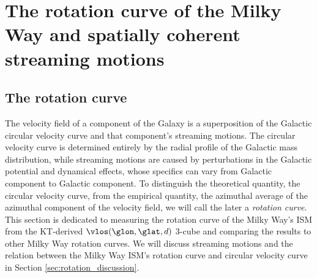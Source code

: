 \section{The rotation curve of the Milky Way and spatially coherent streaming motions}
\label{sec:rotation_curve}

\subsection{The rotation curve}
\label{sec:rotation_fit}

The velocity field of a component of the Galaxy is a superposition of the Galactic circular velocity curve and that component's streaming motions. 
The circular velocity curve is determined entirely by the radial profile of the Galactic mass distribution, while streaming motions are caused by perturbations in the Galactic potential and dynamical effects, whose specifics can vary from Galactic component to Galactic component. 
To distinguish the theoretical quantity, the circular velocity curve, from the empirical quantity, the azimuthal average of the azimuthal component of the velocity field, we will call the later a \emph{rotation curve}. 
This section is dedicated to measuring the rotation curve of the Milky Way's ISM from the KT-derived $\vlos(\glon, \glat, d)$ 3-cube and comparing the results to other Milky Way rotation curves. 
We will discuss streaming motions and the relation between the Milky Way ISM's rotation curve and circular velocity curve in Section \ref{sec:rotation_discussion}.

